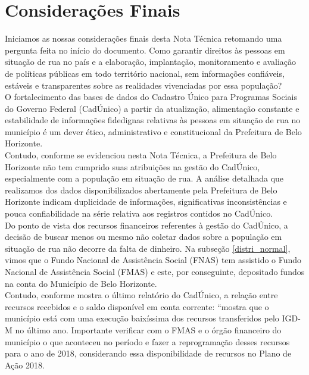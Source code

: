 \documentclass[12pt]{article}
\begin{document}
\newpage
\section{Considerações Finais}
\vspace{1cm}

Iniciamos as nossas considerações finais desta Nota Técnica retomando uma pergunta feita no início do documento. Como garantir direitos às pessoas em situação de rua no país e a elaboração, implantação, monitoramento e avaliação de políticas públicas em todo território nacional, sem informações confiáveis, estáveis e transparentes sobre as realidades vivenciadas por essa população?\\ 

O fortalecimento das bases de dados do Cadastro Único para Programas Sociais do Governo Federal (CadÚnico) a partir da atualização, alimentação constante e estabilidade de informações fidedignas relativas às pessoas em situação de rua no município é um dever ético, administrativo e constitucional da Prefeitura de Belo Horizonte.\\

Contudo, conforme se evidenciou nesta Nota Técnica, a Prefeitura de Belo Horizonte não tem cumprido suas atribuições na gestão do CadÚnico, especialmente com a população em situação de rua. A análise detalhada que realizamos dos dados disponibilizados abertamente pela Prefeitura de Belo Horizonte indicam duplicidade de informações, significativas inconsistências e pouca confiabilidade na série relativa aos registros contidos no CadÚnico.\\

Do ponto de vista dos recursos financeiros referentes à gestão do CadÚnico, a decisão de buscar menos ou mesmo não coletar dados sobre a população em situação de rua não decorre da falta de dinheiro. Na subseção \ref{distri_normal}, vimos que o Fundo Nacional de Assistência Social (FNAS) tem assistido o Fundo Nacional de Assistência Social (FMAS) e este, por conseguinte, depositado fundos na conta do Município de Belo Horizonte.\\ 

Contudo, conforme mostra o último relatório do CadÚnico, a relação entre recursos recebidos e o saldo disponível em conta corrente: ``mostra que o município está com uma execução baixíssima dos recursos transferidos pelo IGD-M no último ano. Importante verificar com o FMAS e o órgão financeiro do município o que aconteceu no período e fazer a reprogramação desses recursos para o ano de 2018, considerando essa disponibilidade de recursos no Plano de Ação 2018.\\ 
\end{document}
